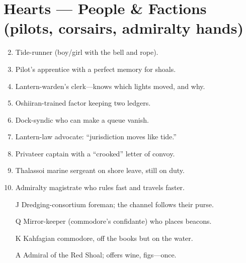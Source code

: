 \section*{Hearts --- People \& Factions (pilots, corsairs, admiralty hands)}
\label{sec:kahfagia-people}
\begin{enumerate}
\setcounter{enumi}{1}
\item Tide-runner (boy/girl with the bell and rope).
\item Pilot's apprentice with a perfect memory for shoals.
\item Lantern-warden's clerk---knows which lights moved, and why.
\item Oshiiran-trained factor keeping two ledgers.
\item Dock-syndic who can make a queue vanish.
\item Lantern-law advocate: ``jurisdiction moves like tide.''
\item Privateer captain with a ``crooked'' letter of convoy.
\item Thalassoi marine sergeant on shore leave, still on duty.
\item Admiralty magistrate who rules fast and travels faster.
\item[J] Dredging-consortium foreman; the channel follows their purse.
\item[Q] Mirror-keeper (commodore's confidante) who places beacons.
\item[K] Kahfagian commodore, off the books but on the water.
\item[A] Admiral of the Red Shoal; offers wine, figs---once.
\end{enumerate}

